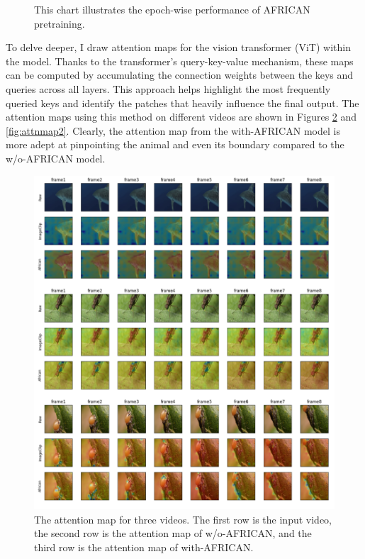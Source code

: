 \begin{figure}[ht]
    \centering
    \resizebox{1.0\textwidth}{!}{}
    \caption[Accuracy of AFRICAN Pretraining on each epoch]{This chart illustrates the epoch-wise performance of AFRICAN pretraining.}
    \label{fig:tp_africanpretraining}
\end{figure}

To delve deeper, I draw attention maps for the vision transformer (ViT) within the model. Thanks to the transformer's query-key-value mechanism, these maps can be computed by accumulating the connection weights between the keys and queries across all layers. This approach helps highlight the most frequently queried keys and identify the patches that heavily influence the final output. The attention maps using this method on different videos are shown in Figures \ref{fig:attnmap1} and \ref{fig:attnmap2}. Clearly, the attention map from the with-AFRICAN model is more adept at pinpointing the animal and even its boundary compared to the w/o-AFRICAN model.

\begin{figure}[ht]
    \centering
    \includegraphics[width=1.0\textwidth]{assets/imgs/5_4_AttentionMaps_1}
    \caption[Attention Map 1]{The attention map for three videos. The first row is the input video, the second row is the attention map of w/o-AFRICAN, and the third row is the attention map of with-AFRICAN.}
    \label{fig:attnmap1}
\end{figure}


